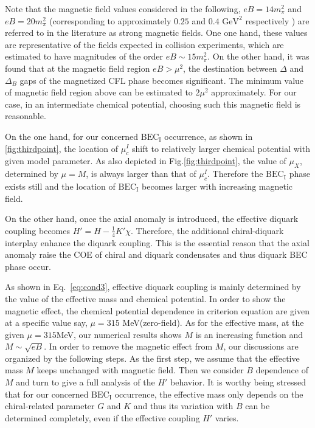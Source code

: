 \documentclass[prd, showpacs,nofootinbib,amsmath,amssymb,12pt]{revtex4}
\begin{document}
Note that the magnetic field values considered in the following, $eB =14m_\pi^2$ and $eB =20 m_\pi^2$ (corresponding to approximately $0.25$ and $0.4$ $\text{GeV}^2$ respectively ) are referred to in the literature as strong magnetic fields.
One one hand, these values are representative of the fields expected in collision experiments, which are estimated to have magnitudes of the order $eB \sim 15 m_\pi^2$\cite{V2009ESTIMATE}.
On the other hand, 
it was found that at the magnetic field region $eB > \mu^2$, the destination between $\Delta$ and $\Delta_B$ gaps of the magnetized CFL phase becomes significant\cite{ferrer2005magnetic}.
The minimum value of  magnetic field region above can be estimated to $2\mu^2$ approximately.  
For our case,  in an intermediate chemical potential,
choosing such this magnetic field is reasonable.

On the one hand, for  our concerned $\text{BEC}_\text{I}$ occurrence, as shown in \ref{fig:thirdpoint}, the location of $\mu^{I}_c$ shift  to relatively larger chemical potential 
with given model parameter. As also depicted in Fig.\ref{fig:thirdpoint}, the value of $\mu_X$, determined by $\mu =M$,  is always larger than that of $\mu^{I}_c$.
Therefore the  $\text{BEC}_\text{I}$ phase exists still and the location of  $\text{BEC}_\text{I}$ becomes larger with 
increasing magnetic field.

On the other hand, once the axial anomaly is introduced,  the effective diquark coupling becomes $H' = H -\frac{1}{4}K'\chi$.
Therefore, the additional chiral-diquark interplay enhance the diquark coupling.
This is the essential reason that the axial anomaly raise the COE of chiral and diquark condensates and thus diquark BEC phase occur.


As shown  in Eq.~\eqref{eq:cond3}, effective diquark coupling is mainly determined by the value of the effective mass and chemical potential.
In order to show the magnetic effect, the chemical potential dependence in criterion equation are given at a specific value say, $\mu= 315$ MeV(zero-field).
As for the effective mass, at the given $\mu=315$MeV, our numerical results shows $M$ is an increasing function and $M \sim \sqrt{eB}$\cite{Gusynin1994Dimensional,Miransky2012Catalysis}.
In order to remove the magnetic effect from $M$, our discussions are organized by the following steps. As the first step, we assume that the effective   mass $M$ keeps unchanged with magnetic field. Then  we consider $B$ dependence of $M$ and turn to give a full analysis of the $H'$ behavior.
It is worthy being stressed that for our concerned $\text{BEC}_\text{I}$ occurrence, the effective mass only depends on the chiral-related parameter $G$ and $K$ and thus its variation with $B$ can be determined completely, even if the effective coupling $H'$ varies.
\end{document}
